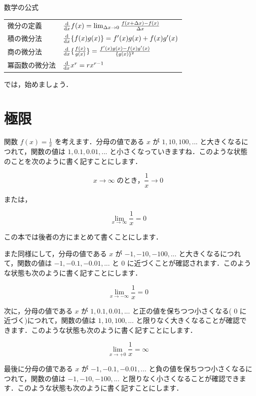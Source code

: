 \documentclass[
  b4paperpaper,
  xelatex,ja=standard]{bxjsbook}
\begin{document}
\begin{Tbox}{数学の公式}

\begin{longtable}[]{@{}
  >{\raggedright\arraybackslash}p{}
  >{\raggedright\arraybackslash}p{}@{}}
\toprule\noalign{}
\endhead
\bottomrule\noalign{}
\endlastfoot
微分の定義 &
\(\dv{x} f(x)=\lim_{\Delta x\rightarrow 0}\frac{f(x+\Delta x)-f(x)}{\Delta x}\) \\
積の微分法 & \(\dv{x}\{f(x)g(x)\}=f'(x)g(x)+f(x)g'(x)\) \\
商の微分法 &
\(\dv{x}\{\frac{f(x)}{g(x)}\}=\frac{f'(x)g(x)-f(x)g'(x)}{\{g(x)\}^2}\) \\
冪函数の微分法 & \(\dv{x}x^r=rx^{r-1}\) \\
\end{longtable}

\end{Tbox}

では，始めましょう．

\hypertarget{ux6975ux9650}{%
\section{極限}\label{ux6975ux9650}}

関数 \(f(x)=\frac{1}{x}\) を考えます．分母の値である \(x\) が
\(1,10,100,...\) と大きくなるにつれて，関数の値は \(1,0.1,0.01,...\)
と小さくなっていきますね．このような状態のことを次のように書く記すことにします．

\[x \to \infty \; \text{のとき，} \frac{1}{x} \to 0\]

または，

\[ \lim_{x\to\infty}\frac{1}{x}=0\]

この本では後者の方にまとめて書くことにします．

また同様にして，分母の値である \(x\) が \(-1,-10,-100,...\)
と大きくなるにつれて，関数の値は \(-1,-0.1,-0.01,...\) と \(0\)
に近づくことが確認されます．このような状態も次のように書く記すことにします．

\[ \lim_{x\to-\infty}\frac{1}{x}=0\]

次に，分母の値である \(x\) が \(1,0.1,0.01,...\)
と正の値を保ちつつ小さくなる( \(0\) に近づく)につれて，関数の値は
\(1,10,100,...\)
と限りなく大きくなることが確認できます．このような状態も次のように書く記すことにします．

\[ \lim_{x\to +0}\frac{1}{x}=\infty\]

最後に分母の値である \(x\) が \(-1,-0.1,-0.01,...\)
と負の値を保ちつつ小さくなるにつれて，関数の値は \(-1,-10,-100,...\)
と限りなく小さくなることが確認できます．このような状態も次のように書く記すことにします．
\end{document}
